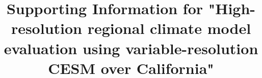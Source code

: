 \documentclass[ms]{agutexSI}
\begin{document}
%
%



\title{Supporting Information for "High-resolution regional climate model evaluation using variable-resolution CESM over California"}
%
%

%
%












%
%

%
\end{document}
